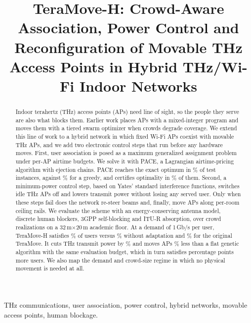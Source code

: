 \documentclass[conference]{IEEEtran}
\begin{document}
\title{TeraMove-H: Crowd-Aware Association, Power Control and Reconfiguration of Movable THz Access Points in Hybrid THz/Wi-Fi Indoor Networks}

\author{
}

\maketitle

\begin{abstract}
Indoor terahertz (THz) access points (APs) need line of sight, so the people they serve are also what blocks them.
Earlier work places APs with a mixed-integer program and moves them with a tiered swarm optimizer when crowds degrade coverage.
We extend this line of work to a hybrid network in which fixed Wi-Fi APs coexist with movable THz APs, and we add two electronic control steps that run before any hardware moves.
First, user association is posed as a maximum generalized assignment problem under per-AP airtime budgets.
We solve it with PACE, a Lagrangian airtime-pricing algorithm with ejection chains.
PACE reaches the exact optimum in \AssocPaceOptimalPct\% of \AssocInstances{} test instances, against \AssocOptimalPct\% for a greedy, and certifies optimality in \AssocCertPct\% of them.
Second, a minimum-power control step, based on Yates' standard interference functions, switches idle THz APs off and lowers transmit power without losing any served user.
Only when these steps fail does the network re-steer beams and, finally, move APs along per-room ceiling rails.
We evaluate the scheme with an energy-conserving antenna model, discrete human blockers, 3GPP self-blocking and ITU-R absorption, over \MainSeeds{} crowd realizations on a 32\,m$\times$20\,m academic floor.
At a demand of 1\,Gb/s per user, TeraMove-H satisfies \PropS\% of users versus \StaticS\% without adaptation and \TmS\% for the original TeraMove.
It cuts THz transmit power by \PowerSaving\% and moves APs \DispReductionVsGa\% less than a flat genetic algorithm with the same evaluation budget, which in turn satisfies \GapToGa{} percentage points more users.
We also map the demand and crowd-size regime in which no physical movement is needed at all.
\end{abstract}

\begin{IEEEkeywords}
THz communications, user association, power control, hybrid networks, movable access points, human blockage.
\end{IEEEkeywords}
\end{document}
